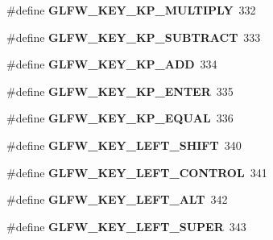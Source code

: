 \begin{DoxyCompactItemize}
\item 
\hypertarget{group__keys_ga9ada267eb0e78ed2ada8701dd24a56ef}{}\#define {\bfseries G\+L\+F\+W\+\_\+\+K\+E\+Y\+\_\+\+K\+P\+\_\+\+M\+U\+L\+T\+I\+P\+L\+Y}~332\label{group__keys_ga9ada267eb0e78ed2ada8701dd24a56ef}

\item 
\hypertarget{group__keys_gaa3dbd60782ff93d6082a124bce1fa236}{}\#define {\bfseries G\+L\+F\+W\+\_\+\+K\+E\+Y\+\_\+\+K\+P\+\_\+\+S\+U\+B\+T\+R\+A\+C\+T}~333\label{group__keys_gaa3dbd60782ff93d6082a124bce1fa236}

\item 
\hypertarget{group__keys_gad09c7c98acc79e89aa6a0a91275becac}{}\#define {\bfseries G\+L\+F\+W\+\_\+\+K\+E\+Y\+\_\+\+K\+P\+\_\+\+A\+D\+D}~334\label{group__keys_gad09c7c98acc79e89aa6a0a91275becac}

\item 
\hypertarget{group__keys_ga4f728f8738f2986bd63eedd3d412e8cf}{}\#define {\bfseries G\+L\+F\+W\+\_\+\+K\+E\+Y\+\_\+\+K\+P\+\_\+\+E\+N\+T\+E\+R}~335\label{group__keys_ga4f728f8738f2986bd63eedd3d412e8cf}

\item 
\hypertarget{group__keys_gaebdc76d4a808191e6d21b7e4ad2acd97}{}\#define {\bfseries G\+L\+F\+W\+\_\+\+K\+E\+Y\+\_\+\+K\+P\+\_\+\+E\+Q\+U\+A\+L}~336\label{group__keys_gaebdc76d4a808191e6d21b7e4ad2acd97}

\item 
\hypertarget{group__keys_ga8a530a28a65c44ab5d00b759b756d3f6}{}\#define {\bfseries G\+L\+F\+W\+\_\+\+K\+E\+Y\+\_\+\+L\+E\+F\+T\+\_\+\+S\+H\+I\+F\+T}~340\label{group__keys_ga8a530a28a65c44ab5d00b759b756d3f6}

\item 
\hypertarget{group__keys_ga9f97b743e81460ac4b2deddecd10a464}{}\#define {\bfseries G\+L\+F\+W\+\_\+\+K\+E\+Y\+\_\+\+L\+E\+F\+T\+\_\+\+C\+O\+N\+T\+R\+O\+L}~341\label{group__keys_ga9f97b743e81460ac4b2deddecd10a464}

\item 
\hypertarget{group__keys_ga7f27dabf63a7789daa31e1c96790219b}{}\#define {\bfseries G\+L\+F\+W\+\_\+\+K\+E\+Y\+\_\+\+L\+E\+F\+T\+\_\+\+A\+L\+T}~342\label{group__keys_ga7f27dabf63a7789daa31e1c96790219b}

\item 
\hypertarget{group__keys_gafb1207c91997fc295afd1835fbc5641a}{}\#define {\bfseries G\+L\+F\+W\+\_\+\+K\+E\+Y\+\_\+\+L\+E\+F\+T\+\_\+\+S\+U\+P\+E\+R}~343\label{group__keys_gafb1207c91997fc295afd1835fbc5641a}


\end{DoxyCompactItemize}
